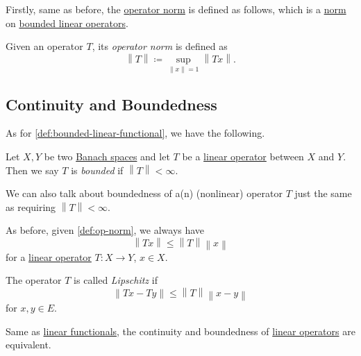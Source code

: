 Firstly, same as before, the \hyperref[def:op-norm]{operator norm} is defined as follows, which is a \hyperref[def:norm]{norm} on \hyperref[def:bounded-linear-op]{bounded linear operators}.

\begin{definition}\label{def:op-norm}
	Given an operator \(T\), its \emph{operator norm} is defined as
	\[
		\left\lVert T\right\rVert \coloneqq \sup _{\left\lVert x\right\rVert = 1} \left\lVert Tx\right\rVert.
	\]
\end{definition}

\subsection{Continuity and Boundedness}
As for \autoref{def:bounded-linear-functional}, we have the following.
\begin{definition*}\label{def:bounded-linear-op}
	Let \(X, Y\) be two \hyperref[def:Banach-space]{Banach spaces} and let \(T\) be a \hyperref[def:linear-op]{linear operator} between \(X\) and \(Y\). Then we say \(T\) is \emph{bounded} if \(\left\lVert T\right\rVert < \infty \).
\end{definition*}

\begin{remark}\label{rmk:bounded-op}
	We can also talk about boundedness of a(n) (nonlinear) operator \(T\) just the same as requiring \(\left\lVert T\right\rVert < \infty \).
\end{remark}

As before, given \autoref{def:op-norm}, we always have
\[
	\left\lVert Tx\right\rVert \leq \left\lVert T\right\rVert \left\lVert x\right\rVert
\]
for a \hyperref[def:linear-op]{linear operator} \(T\colon X\to Y\), \(x\in X\).

\begin{definition}[Lipschitz]\label{def:Lipschitz}
	The operator \(T\) is called \emph{Lipschitz} if
	\[
		\left\lVert Tx - Ty\right\rVert \leq \left\lVert T\right\rVert \left\lVert x - y\right\rVert
	\]
	for \(x, y\in E\).
\end{definition}

\begin{remark}
	Same as \hyperref[def:linear-functional]{linear functionals}, the continuity and boundedness of \hyperref[def:linear-op]{linear operators} are equivalent.
\end{remark}

